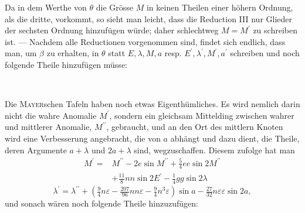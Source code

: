 \clearpage
\begingroup
{}
\renewcommand{\headrulewidth}{0pt}
\par\noindent\hspace*{\parindent}Da in dem Werthe von \(\theta\) die Grösse \(M\) in keinen Theilen einer höhern
Ordnung, als die dritte, vorkommt, so sieht man leicht, dass die Reduction
III nur Glieder der sechsten Ordnung hinzufügen würde; daher schlechtweg
\(M=M^{\prime}\) zu schreiben ist. — Nachdem alle Reductionen vorgenommen sind,
findet sich endlich, dass man, um \(\beta\) zu erhalten, in \(\theta\) statt \(E,\lambda,M,a\) resp.
\(E^{\prime},\lambda^{\prime},M^{\prime},a^{\prime}\) schreiben und noch folgende Theile hinzufügen müsse:
\begin{center}
\\[4pt]
\end{center}
\par\noindent\hspace*{\parindent}Die \textsc{Mayer}schen Tafeln haben noch etwas Eigenthümliches. Es wird
nemlich darin nicht die wahre Anomalie \(M^{\prime}\), sondern ein gleichsam Mittelding
zwischen wahrer und mittlerer Anomalie, \(M^{\prime\prime}\), gebraucht, und an den
Ort des mittlern Knoten wird eine Verbesserung angebracht, die von \(a\) abhängt
und dazu dient, die Theile, deren Argumente \(a+\lambda\) und \(2a+\lambda\) sind,
wegzuschaffen. Diesem zufolge hat man
\[
\begin{aligned}
M^{\prime}={}&M^{\prime\prime}-2e\sin M^{\prime\prime}
 +\tfrac54ee\sin2M^{\prime\prime}\\
&+\tfrac{11}{8}nn\sin2E^{\prime}-\tfrac14gg\sin2\lambda
\end{aligned}
\]
\[
\lambda^{\prime}=\lambda^{\prime\prime}
 +\left(\tfrac94n\varepsilon-\tfrac{207}{96}nn\varepsilon
 -\tfrac94n^3\varepsilon\right)\sin a
 -\tfrac{27}{32}n\varepsilon\varepsilon\sin2a,
\]
\noindent und sonach wären noch folgende Theile hinzuzufügen:
\begin{center}
\\[4pt]
\end{center}
